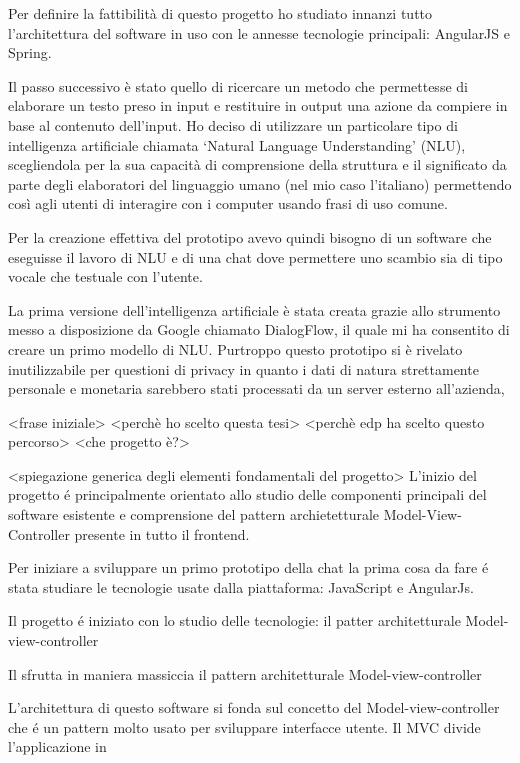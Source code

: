 Per definire la fattibilità di questo progetto ho studiato innanzi tutto l’architettura del software in uso con le annesse tecnologie principali: AngularJS e Spring.

Il passo successivo è stato quello di ricercare un metodo che permettesse di elaborare un testo preso in input e restituire in output una azione da compiere in base al contenuto dell’input. Ho deciso di utilizzare un particolare tipo di intelligenza artificiale chiamata ‘Natural Language Understanding’ (NLU), scegliendola per la sua capacità di comprensione della struttura e il significato da parte degli elaboratori del linguaggio umano (nel mio caso l’italiano) permettendo così agli utenti di interagire con i computer usando frasi di uso comune.

Per la creazione effettiva del prototipo avevo quindi bisogno di un software che eseguisse il lavoro di NLU e di una chat dove permettere uno scambio sia di tipo vocale che testuale con l’utente.

La prima versione dell’intelligenza artificiale è stata creata grazie allo strumento messo a disposizione da Google chiamato DialogFlow, il quale mi ha consentito di creare un primo modello di NLU. Purtroppo questo prototipo si è rivelato inutilizzabile per questioni di privacy in quanto i dati di natura strettamente personale e monetaria sarebbero stati processati da un server esterno all’azienda, 





<frase iniziale> 
<perchè ho scelto questa tesi>
<perchè edp ha scelto questo percorso>
<che progetto è?>

<spiegazione generica degli elementi fondamentali del progetto>
L'inizio del progetto \'e principalmente orientato allo studio delle componenti principali del software esistente e comprensione del pattern archietetturale Model-View-Controller presente in tutto il frontend.

Per iniziare a sviluppare un primo prototipo della chat la prima cosa da fare \'e stata studiare le tecnologie usate dalla piattaforma: JavaScript e AngularJs.  

Il progetto \'e iniziato con lo studio delle tecnologie: il patter architetturale Model-view-controller

Il sfrutta in maniera massiccia il pattern architetturale Model-view-controller

L'architettura di questo software si fonda sul concetto del Model-view-controller che \'e un pattern molto usato per sviluppare interfacce utente. Il MVC divide l'applicazione in 

